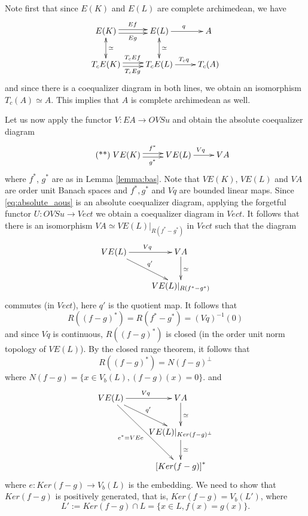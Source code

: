 \documentclass[12pt]{article}
\newcommand{\<}{\langle}
\begin{document}
Note first that since $E(K)$ and $E(L)$ are complete archimedean, we have 
\[
\xymatrix{
E(K) \ar@<.5ex>[r]^{Ef} \ar@<-.5ex>[r]_{Eg} \ar@{<->}^{\simeq}[d]&E(L)\ar[r]^q \ar@{<->}^\simeq[d]& A\\
T_cE(K)\ar@<.5ex>[r]^{T_cEf} \ar@<-.5ex>[r]_{T_cEg} &T_cE(L)\ar[r]^{T_cq}& T_c(A) }
\]
and since there is a coequalizer diagram in both lines, we obtain an isomorphism $T_c(A)\simeq A$. This implies that 
 $A$ is complete archimedean as well.

Let us now apply the functor $V:EA\to OVSu$ and  obtain the absolute coequalizer diagram 
\begin{equation}\label{eq:absolute_aous}\tag{**}
\xymatrix{
VE(K) \ar@<.5ex>[r]^{f^*} \ar@<-.5ex>[r]_{g^*} &VE(L)\ar[r]^{Vq} & VA }
\end{equation}
where $f^*$, $g^*$ are as in Lemma \ref{lemma:bas}. Note that $VE(K)$, $VE(L)$ and $VA$ are order unit Banach spaces and $f^*,g^*$ and $Vq$ are bounded linear maps.
 Since  \eqref{eq:absolute_aous} is an absolute coequalizer diagram, applying the forgetful functor $U: OVSu\to Vect$ we obtain a coequalizer diagram in $Vect$. It follows that there is an isomorphism $VA\simeq VE(L)|_{R(f^*-g^*)}$ in $Vect$ such that the diagram
\[
\xymatrix{VE(L)\ar[r]^{Vq} \ar[rd]^{q'}& VA \ar[d]^{\simeq} \\  & VE(L)|_{R(f^*-g^*)}} 
\] 
commutes (in $Vect$), here $q'$ is the quotient map. It follows that 
\[
R((f-g)^*)=R(f^*-g^*)=(Vq)^{-1}(0)
\]
 and since $Vq$ is continuous, $R((f-g)^*)$ is closed (in the order unit norm topology of $VE(L)$). By the closed range theorem, it follows that
\[ 
R((f-g)^*)=N(f-g)^\perp
\]
where $N(f-g)=\{x\in V_b(L), (f-g)(x)=0\}$.
 and
\[
\xymatrix{VE(L)\ar[r]^{Vq} \ar[rd]^{q'} \ar[rdd]_{e^*=VEe}& VA \ar[d]^{\simeq} \\  & VE(L)|_{Ker(f-g)^\perp}\ar[d]^\simeq \\
& \left[Ker(f-g)\right]^*}
\]
where $e: Ker(f-g)\to V_b(L)$ is the embedding. We need to show that $Ker(f-g)$ is positively generated, that is, 
$Ker(f-g)=V_b(L')$, where 
\[
L':=Ker(f-g)\cap L=\{x\in L, f(x)=g(x)\}.
\]




 
\end{document}
